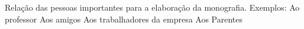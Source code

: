 \begin{agradecimentos}
\paragrafo{}
Relação das pessoas importantes para a elaboração da monografia.
\paragrafo{}
Exemplos: 
\paragrafo{}
Ao professor 
\paragrafo{}
Aos amigos
\paragrafo{}
Aos trabalhadores da empresa 
\paragrafo{}
Aos Parentes
\end{agradecimentos}